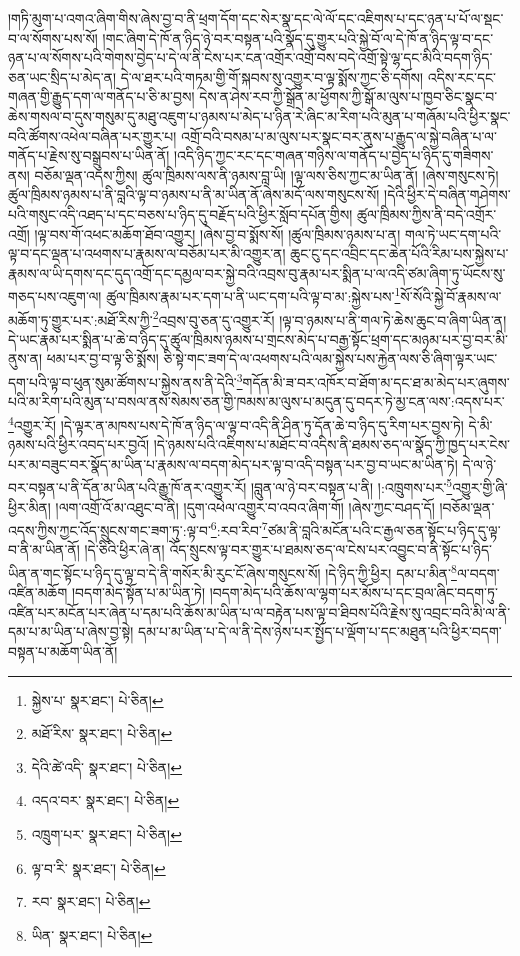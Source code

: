 །གཏི་མུག་པ་འགའ་ཞིག་གིས་ཞེས་བྱ་བ་ནི་ཕྲག་དོག་དང་སེར་སྣ་དང་ལེ་ལོ་དང་འཇིགས་པ་དང་ཉན་པ་པོ་ལ་སྡང་བ་ལ་སོགས་པས་སོ། །གང་ཞིག་དེ་ཁོ་ན་ཉིད་ཉེ་བར་བསྟན་པའི་སྣོད་དུ་གྱུར་པའི་སྐྱེ་བོ་ལ་དེ་ཁོ་ན་ཉིད་ལྟ་བ་དང་ཉན་པ་ལ་སོགས་པའི་གེགས་བྱེད་པ་དེ་ལ་ནི་ངེས་པར་ངན་འགྲོར་འགྲོ་བས་བདེ་འགྲོ་སྟེ་ལྷ་དང་མིའི་བདག་ཉིད་ཅན་ཡང་སྲིད་པ་མེད་ན། དེ་ལ་ཐར་པའི་གཏམ་གྱི་གོ་སྐབས་སུ་འགྱུར་བ་ལྟ་སྨོས་ཀྱང་ཅི་དགོས། འདིས་རང་དང་གཞན་གྱི་རྒྱུད་དག་ལ་གནོད་པ་ཅི་མ་བྱས། དེས་ན་ཤེས་རབ་ཀྱི་སྒྲོན་མ་ཕྱོགས་ཀྱི་སྒོ་མ་ལུས་པ་ཁྱབ་ཅིང་སྣང་བ་ཆེས་གསལ་བ་དུས་གསུམ་དུ་མཐུ་འཇུག་པ་ཉམས་པ་མེད་པ་ཉིན་རེ་ཞིང་མ་རིག་པའི་མུན་པ་གཞོམ་པའི་ཕྱིར་སྣང་བའི་ཚོགས་འཕེལ་བཞིན་པར་གྱུར་པ། འགྲོ་བའི་བསམ་པ་མ་ལུས་པར་སྣང་བར་ནུས་པ་རྒྱུད་ལ་སྐྱེ་བཞིན་པ་ལ་གནོད་པ་རྗེས་སུ་བསྒྲུབས་པ་ཡིན་ནོ། །འདི་ཉིད་ཀྱང་རང་དང་གཞན་གཉིས་ལ་གནོད་པ་བྱེད་པ་ཉིད་དུ་གཟིགས་ནས། བཅོམ་ལྡན་འདས་ཀྱིས། ཚུལ་ཁྲིམས་ལས་ནི་ཉམས་བླ་ཡི། །ལྟ་ལས་ཅིས་ཀྱང་མ་ཡིན་ནོ། །ཞེས་གསུངས་ཏེ། ཚུལ་ཁྲིམས་ཉམས་པ་ནི་བླའི་ལྟ་བ་ཉམས་པ་ནི་མ་ཡིན་ནོ་ཞེས་མདོ་ལས་གསུངས་སོ། །དེའི་ཕྱིར་དེ་བཞིན་གཤེགས་པའི་གསུང་འདི་འཐད་པ་དང་བཅས་པ་ཉིད་དུ་བརྗོད་པའི་ཕྱིར་སློབ་དཔོན་གྱིས། ཚུལ་ཁྲིམས་ཀྱིས་ནི་བདེ་འགྲོར་འགྲོ། །ལྟ་བས་གོ་འཕང་མཆོག་ཐོབ་འགྱུར། །ཞེས་བྱ་བ་སྨོས་སོ། །ཚུལ་ཁྲིམས་ཉམས་པ་ན། གལ་ཏེ་ཡང་དག་པའི་ལྟ་བ་དང་ལྡན་པ་འཕགས་པ་རྣམས་ལ་བཅོམ་པར་མི་འགྱུར་ན། ཆུང་ངུ་དང་འབྲིང་དང་ཆེན་པོའི་རིམ་པས་སྐྱེས་པ་རྣམས་ལ་ཡི་དགས་དང་དུད་འགྲོ་དང་དམྱལ་བར་སྐྱེ་བའི་འབྲས་བུ་རྣམ་པར་སྨིན་པ་ལ་འདི་ཙམ་ཞིག་ཏུ་ཡོངས་སུ་གཅད་པས་འཇུག་ལ། ཚུལ་ཁྲིམས་རྣམ་པར་དག་པ་ནི་ཡང་དག་པའི་ལྟ་བ་མ་:སྐྱེས་པས་\footnote{སྐྱེས་པ་  སྣར་ཐང་།  པེ་ཅིན། }སོ་སོའི་སྐྱེ་བོ་རྣམས་ལ་མཆོག་ཏུ་གྱུར་པར་:མཐོ་རིས་ཀྱི་\footnote{མཐོ་རིས་  སྣར་ཐང་།  པེ་ཅིན། }འབྲས་བུ་ཅན་དུ་འགྱུར་རོ། །ལྟ་བ་ཉམས་པ་ནི་གལ་ཏེ་ཆེས་ཆུང་བ་ཞིག་ཡིན་ན། དེ་ཡང་རྣམ་པར་སྨིན་པ་ཆེ་བ་ཉིད་དུ་ཚུལ་ཁྲིམས་ཉམས་པ་གྲངས་མེད་པ་བརྒྱ་སྟོང་ཕྲག་དང་མཉམ་པར་བྱ་བར་མི་ནུས་ན། ཕམ་པར་བྱ་བ་ལྟ་ཅི་སྨོས། ཅི་སྟེ་གང་ཟག་དེ་ལ་འཕགས་པའི་ལམ་སྐྱེས་པས་རྐྱེན་ལས་ཅི་ཞིག་ལྟར་ཡང་དག་པའི་ལྟ་བ་ཕུན་སུམ་ཚོགས་པ་སྐྱེས་ནས་ནི་དེའི་\footnote{དེའི་ཚེ་འདི་  སྣར་ཐང་།  པེ་ཅིན། }གདོན་མི་ཟ་བར་འཁོར་བ་ཐོག་མ་དང་ཐ་མ་མེད་པར་ཞུགས་པའི་མ་རིག་པའི་མུན་པ་བསལ་ནས་སེམས་ཅན་གྱི་ཁམས་མ་ལུས་པ་མདུན་དུ་བདར་ཏེ་མྱ་ངན་ལས་:འདས་པར་\footnote{འདའ་བར་  སྣར་ཐང་།  པེ་ཅིན། }འགྱུར་རོ། །དེ་ལྟར་ན་མཁས་པས་དེ་ཁོ་ན་ཉིད་ལ་ལྟ་བ་འདི་ནི་ཤིན་ཏུ་དོན་ཆེ་བ་ཉིད་དུ་རིག་པར་བྱས་ཏེ། དེ་མི་ཉམས་པའི་ཕྱིར་འབད་པར་བྱའོ། །དེ་ཉམས་པའི་འཇིགས་པ་མཐོང་བ་འདིས་ནི་ཐམས་ཅད་ལ་སྣོད་ཀྱི་ཁྱད་པར་ངེས་པར་མ་བཟུང་བར་སྣོད་མ་ཡིན་པ་རྣམས་ལ་བདག་མེད་པར་ལྟ་བ་འདི་བསྟན་པར་བྱ་བ་ཡང་མ་ཡིན་ཏེ། དེ་ལ་ཉེ་བར་བསྟན་པ་ནི་དོན་མ་ཡིན་པའི་རྒྱུ་ཁོ་ནར་འགྱུར་རོ། །བླུན་ལ་ཉེ་བར་བསྟན་པ་ནི། །:འཁྲུགས་པར་\footnote{འཁྲུག་པར་  སྣར་ཐང་།  པེ་ཅིན། }འགྱུར་གྱི་ཞི་ཕྱིར་མིན། །ལག་འགྲོ་འོ་མ་འཐུང་བ་ནི། །དུག་འཕེལ་འགྱུར་བ་འབའ་ཞིག་གོ། །ཞེས་ཀྱང་བཤད་དོ། །བཅོམ་ལྡན་འདས་ཀྱིས་ཀྱང་འོད་སྲུངས་གང་ཟག་ཏུ་:ལྟ་བ་\footnote{ལྟ་བ་རི་  སྣར་ཐང་།  པེ་ཅིན། }:རབ་རིབ་\footnote{རབ་  སྣར་ཐང་།  པེ་ཅིན། }ཙམ་ནི་བླའི་མངོན་པའི་ང་རྒྱལ་ཅན་སྟོང་པ་ཉིད་དུ་ལྟ་བ་ནི་མ་ཡིན་ནོ། །དེ་ཅིའི་ཕྱིར་ཞེ་ན། འོད་སྲུངས་ལྟ་བར་གྱུར་པ་ཐམས་ཅད་ལ་ངེས་པར་འབྱུང་བ་ནི་སྟོང་པ་ཉིད་ཡིན་ན་གང་སྟོང་པ་ཉིད་དུ་ལྟ་བ་དེ་ནི་གསོར་མི་རུང་ངོ་ཞེས་གསུངས་སོ། །དེ་ཉིད་ཀྱི་ཕྱིར། དམ་པ་མིན་\footnote{ཡིན་  སྣར་ཐང་།  པེ་ཅིན། }ལ་བདག་འཛིན་མཆོག །བདག་མེད་སྟོན་པ་མ་ཡིན་ཏེ། །བདག་མེད་པའི་ཆོས་ལ་ལྷག་པར་མོས་པ་དང་བྲལ་ཞིང་བདག་ཏུ་འཛིན་པར་མངོན་པར་ཞེན་པ་དམ་པའི་ཆོས་མ་ཡིན་པ་ལ་བརྟེན་པས་ལྟ་བ་ཐིབས་པོའི་རྗེས་སུ་འབྲང་བའི་མི་ལ་ནི་དམ་པ་མ་ཡིན་པ་ཞེས་བྱ་སྟེ། དམ་པ་མ་ཡིན་པ་དེ་ལ་ནི་དེས་ཉེས་པར་སྤྱོད་པ་ལྡོག་པ་དང་མཐུན་པའི་ཕྱིར་བདག་བསྟན་པ་མཆོག་ཡིན་ནོ། 